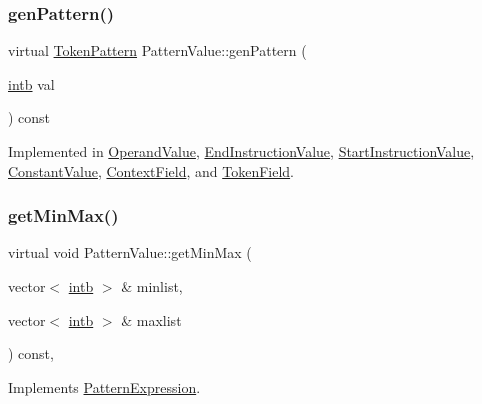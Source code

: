 \subsubsection{\texorpdfstring{genPattern()}{genPattern()}}
{\footnotesize\ttfamily virtual \mbox{\hyperlink{class_token_pattern}{Token\+Pattern}} Pattern\+Value\+::gen\+Pattern (\begin{DoxyParamCaption}\item[{\mbox{\hyperlink{types_8h_aa925ba3e627c2df89d5b1cfe84fb8572}{intb}}}]{val }\end{DoxyParamCaption}) const\hspace{0.3cm}{\ttfamily [pure virtual]}}



Implemented in \mbox{\hyperlink{class_operand_value_ab0c4823f1e2e5f9a26a403dce82f4310}{Operand\+Value}}, \mbox{\hyperlink{class_end_instruction_value_a8a4ae4571a25a17accdf7260e1412b44}{End\+Instruction\+Value}}, \mbox{\hyperlink{class_start_instruction_value_a58682ad2f7b1925cce6e70df51727fad}{Start\+Instruction\+Value}}, \mbox{\hyperlink{class_constant_value_a822cafedaecd1036f0eaf71ec34c6fc6}{Constant\+Value}}, \mbox{\hyperlink{class_context_field_a678309088b2bad377ad5a5894509988b}{Context\+Field}}, and \mbox{\hyperlink{class_token_field_a4ce6c18cfc9973c24d7da7314ce8092e}{Token\+Field}}.

\mbox{\label{class_pattern_value_add81554f00ea23c27314f7699ef2b5f3}} 
\subsubsection{\texorpdfstring{getMinMax()}{getMinMax()}}
{\footnotesize\ttfamily virtual void Pattern\+Value\+::get\+Min\+Max (\begin{DoxyParamCaption}\item[{vector$<$ \mbox{\hyperlink{types_8h_aa925ba3e627c2df89d5b1cfe84fb8572}{intb}} $>$ \&}]{minlist,  }\item[{vector$<$ \mbox{\hyperlink{types_8h_aa925ba3e627c2df89d5b1cfe84fb8572}{intb}} $>$ \&}]{maxlist }\end{DoxyParamCaption}) const\hspace{0.3cm}{\ttfamily [inline]}, {\ttfamily [virtual]}}



Implements \mbox{\hyperlink{class_pattern_expression_a4ceb88e89308ac58bf1af4174228f3a0}{Pattern\+Expression}}.



